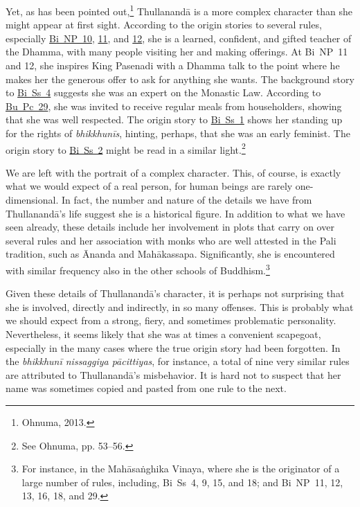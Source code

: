 \documentclass[12pt,openany]{book}%
\begin{document}
Yet, as has been pointed out,\footnote{Ohnuma, 2013. } \textsanskrit{Thullanandā} is a more complex character than she might appear at first sight. According to the origin stories to several rules, especially \href{https://suttacentral.net/pli-tv-bi-vb-np10/en/brahmali\#1.2}{Bi~NP~10}, \href{https://suttacentral.net/pli-tv-bi-vb-np11/en/brahmali\#1.2}{11}, and \href{https://suttacentral.net/pli-tv-bi-vb-np12/en/brahmali\#1.2}{12}, she is a learned, confident, and gifted teacher of the Dhamma, with many people visiting her and making offerings. At Bi NP 11 and 12, she inspires King Pasenadi with a Dhamma talk to the point where he makes her the generous offer to ask for anything she wants. The background story to \href{https://suttacentral.net/pli-tv-bi-vb-ss4/en/brahmali\#1.1}{Bi~Ss~4} suggests she was an expert on the Monastic Law. According to \href{https://suttacentral.net/pli-tv-bu-vb-pc29/en/brahmali\#1.2}{Bu~Pc~29}, she was invited to receive regular meals from householders, showing that she was well respected. The origin story to \href{https://suttacentral.net/pli-tv-bi-vb-ss1/en/brahmali\#1.25}{Bi~Ss~1} shows her standing up for the rights of \textit{\textsanskrit{bhikkhunīs}}, hinting, perhaps, that she was an early feminist. The origin story to \href{https://suttacentral.net/pli-tv-bi-vb-ss2/en/brahmali\#1.1}{Bi~Ss~2} might be read in a similar light.\footnote{See Ohnuma, pp. 53–56. }

We are left with the portrait of a complex character. This, of course, is exactly what we would expect of a real person, for human beings are rarely one-dimensional. In fact, the number and nature of the details we have from \textsanskrit{Thullanandā}’s life suggest she is a historical figure. In addition to what we have seen already, these details include her involvement in plots that carry on over several rules and her association with monks who are well attested in the Pali tradition, such as Ānanda and \textsanskrit{Mahākassapa}. Significantly, she is encountered with similar frequency also in the other schools of Buddhism.\footnote{For instance, in the \textsanskrit{Mahāsaṅghika} Vinaya, where she is the originator of a large number of rules, including, Bi Ss 4, 9, 15, and 18; and Bi NP 11, 12, 13, 16, 18, and 29. }

Given these details of \textsanskrit{Thullanandā}’s character, it is perhaps not surprising that she is involved, directly and indirectly, in so many offenses. This is probably what we should expect from a strong, fiery, and sometimes problematic personality. Nevertheless, it seems likely that she was at times a convenient scapegoat, especially in the many cases where the true origin story had been forgotten. In the \textit{\textsanskrit{bhikkhunī} nissaggiya \textsanskrit{pācittiyas}}, for instance, a total of nine very similar rules are attributed to \textsanskrit{Thullanandā}’s misbehavior. It is hard not to suspect that her name was sometimes copied and pasted from one rule to the next.
\end{document}
